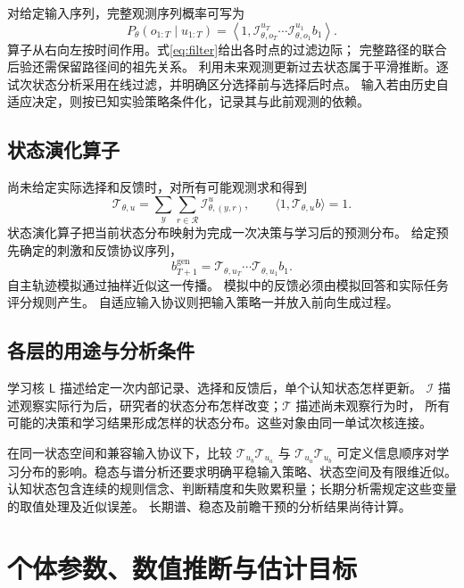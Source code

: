 \documentclass[11pt,a4paper]{article}
\numberwithin{equation}{section}
\newcommand{\Rr}{\mathcal{R}}
\newcommand{\Ll}{\mathsf{L}}
\newcommand{\Ii}{\mathcal{I}}
\newcommand{\Tt}{\mathcal{T}}
\begin{document}
对给定输入序列，完整观测序列概率可写为
\begin{equation}
P_\theta(o_{1:T}\mid u_{1:T})=
\left\langle1,\Ii_{\theta,o_T}^{u_T}\cdots\Ii_{\theta,o_1}^{u_1}b_1\right\rangle.
\label{eq:sequence-operator}
\end{equation}
算子从右向左按时间作用。式\eqref{eq:filter}给出各时点的过滤边际；
完整路径的联合后验还需保留路径间的祖先关系。
利用未来观测更新过去状态属于平滑推断。逐试次状态分析采用在线过滤，并明确区分选择前与选择后时点。
输入若由历史自适应决定，则按已知实验策略条件化，记录其与此前观测的依赖。

\subsection{状态演化算子}
尚未给定实际选择和反馈时，对所有可能观测求和得到
\begin{equation}
\Tt_{\theta,u}=\sum_y\sum_{r\in\Rr}\Ii_{\theta,(y,r)}^{u},\qquad
\langle1,\Tt_{\theta,u}b\rangle=1.
\label{eq:evolution}
\end{equation}
状态演化算子把当前状态分布映射为完成一次决策与学习后的预测分布。
给定预先确定的刺激和反馈协议序列，
\begin{equation}
b_{T+1}^{\mathrm{gen}}=\Tt_{\theta,u_T}\cdots\Tt_{\theta,u_1}b_1.
\end{equation}
自主轨迹模拟通过抽样近似这一传播。
模拟中的反馈必须由模拟回答和实际任务评分规则产生。
自适应输入协议则把输入策略一并放入前向生成过程。

\subsection{各层的用途与分析条件}
学习核 $\Ll$ 描述给定一次内部记录、选择和反馈后，单个认知状态怎样更新。
$\Ii$ 描述观察实际行为后，研究者的状态分布怎样改变；$\Tt$ 描述尚未观察行为时，
所有可能的决策和学习结果形成怎样的状态分布。这些对象由同一单试次核连接。

在同一状态空间和兼容输入协议下，比较 $\Tt_{u_b}\Tt_{u_a}$ 与 $\Tt_{u_a}\Tt_{u_b}$
可定义信息顺序对学习分布的影响。稳态与谱分析还要求明确平稳输入策略、状态空间及有限维近似。
认知状态包含连续的规则信念、判断精度和失败累积量；长期分析需规定这些变量的取值处理及近似误差。
长期谱、稳态及前瞻干预的分析结果尚待计算。

\section{个体参数、数值推断与估计目标}
\label{sec:inference}
\end{document}
